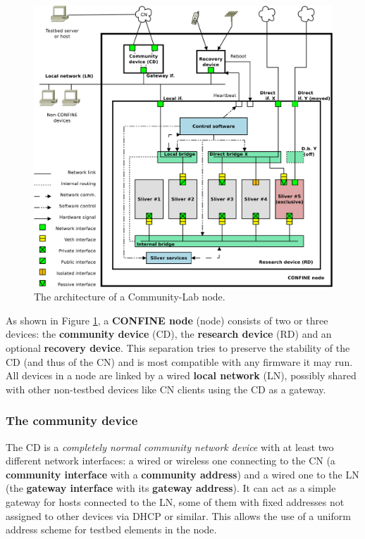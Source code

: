 \documentclass[conference]{IEEEtran}
\begin{document}
\begin{figure}[!t]
\centering
\vspace*{0.2cm}
\includegraphics[width=0.92\linewidth]{node-arch}
\caption{The architecture of a Community-Lab node.}
\label{fig:node-arch}
\end{figure}

As shown in Figure \ref{fig:node-arch}, a \textbf{CONFINE node} (node)
consists of two or three devices: the \textbf{community device} (CD), the
\textbf{research device} (RD) and an optional \textbf{recovery device}.  This
separation tries to preserve the stability of the CD (and thus of the CN) and
is most compatible with any firmware it may run.  All devices in a node are
linked by a wired \textbf{local network} (LN), possibly shared with other
non-testbed devices like CN clients using the CD as a gateway.

\subsubsection{The community device}

The CD is a \emph{completely normal community network device} with at least
two different network interfaces: a wired or wireless one connecting to the CN
(a \textbf{community interface} with a \textbf{community address}) and a wired
one to the LN (the \textbf{gateway interface} with its \textbf{gateway
  address}).  It can act as a simple gateway for hosts connected to the LN,
some of them with fixed addresses not assigned to other devices via DHCP or
similar.  This allows the use of a uniform address scheme for testbed elements
in the node.
\end{document}
